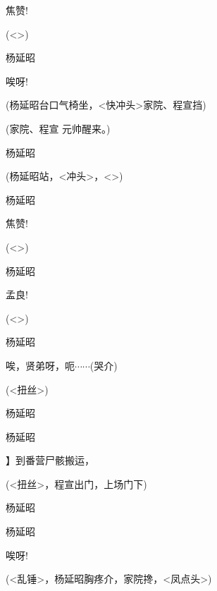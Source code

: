 {焦赞!

(\textless{}\!\textgreater{})

杨延昭\hspace{20pt}~

唉呀!

(杨延昭台口气椅坐{，\textless{}快冲头\textgreater{}家院、}程宣挡)

(家院、程宣 元帅醒来。)

杨延昭\hspace{20pt}~


(杨延昭站，{\textless{}冲头\textgreater{}，}\textless{}\!\textgreater{})

杨延昭\hspace{20pt}~

焦赞!

(\textless{}\!\textgreater{})

杨延昭\hspace{20pt}~

孟良!

(\textless{}\!\textgreater{})

杨延昭\hspace{20pt}~

唉，贤弟呀，呃$\cdots{}\cdots{}$(哭介)

({\textless{}扭丝\textgreater{}})

杨延昭


杨延昭\hspace{20pt}~

】到番营尸骸搬运， }

({\textless{}扭丝\textgreater{}，程宣}出门{，}上场门下)

杨延昭


杨延昭\hspace{20pt}~

唉呀!

({\textless{}乱锤\textgreater{}，杨延昭}胸疼介{，家院}搀{，\textless{}凤点头\textgreater{}})

